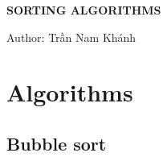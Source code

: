 \documentclass[12pt]{article}
\begin{document}
\begin{titlepage}
    \begin{center}
        \vspace*{\fill}
        \textbf{\Huge SORTING ALGORITHMS}
        \item \large Author: \foreignlanguage{vietnamese}{Trần Nam Khánh}
        \vspace*{\fill}
    \end{center}
\end{titlepage}
\tableofcontents
\newpage

\section{Algorithms}

    \subsection{Bubble sort}
\end{document}

